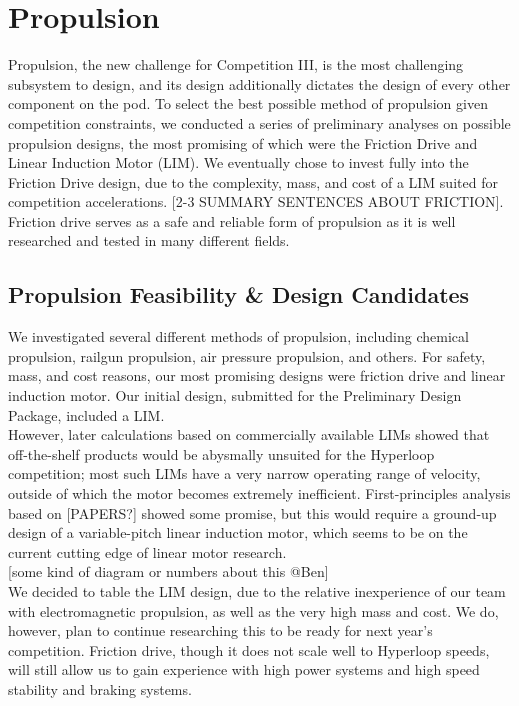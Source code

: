 \documentclass[main.tex]{subfile}
\begin{document}
    \section{Propulsion}
    Propulsion, the new challenge for Competition III, is the most challenging subsystem to design, and its design additionally dictates the design of every other component on the pod. To select the best possible method of propulsion given competition constraints, we conducted a series of preliminary analyses on possible propulsion designs, the most promising of which were the Friction Drive and Linear Induction Motor (LIM). We eventually chose to invest fully into the Friction Drive design, due to the complexity, mass, and cost of a LIM suited for competition accelerations. [2-3 SUMMARY SENTENCES ABOUT FRICTION]. Friction drive serves as a safe and reliable form of propulsion as it is well researched and tested in many different fields.

    \subsection{Propulsion Feasibility \& Design Candidates}
    We investigated several different methods of propulsion, including chemical propulsion, railgun propulsion, air pressure propulsion, and others. For safety, mass, and cost reasons, our most promising designs were friction drive and linear induction motor. Our initial design, submitted for the Preliminary Design Package, included a LIM.\\

    However, later calculations based on commercially available LIMs showed that off-the-shelf products would be abysmally unsuited for the Hyperloop competition; most such LIMs have a very narrow operating range of velocity, outside of which the motor becomes extremely inefficient. First-principles analysis based on [PAPERS?] showed some promise, but this would require a ground-up design of a variable-pitch linear induction motor, which seems to be on the current cutting edge of linear motor research.\\

    [some kind of diagram or numbers about this @Ben]\\

    We decided to table the LIM design, due to the relative inexperience of our team with electromagnetic propulsion, as well as the very high mass and cost. We do, however, plan to continue researching this to be ready for next year’s competition. Friction drive, though it does not scale well to Hyperloop speeds, will still allow us to gain experience with high power systems and high speed stability and braking systems.\\
\end{document}
